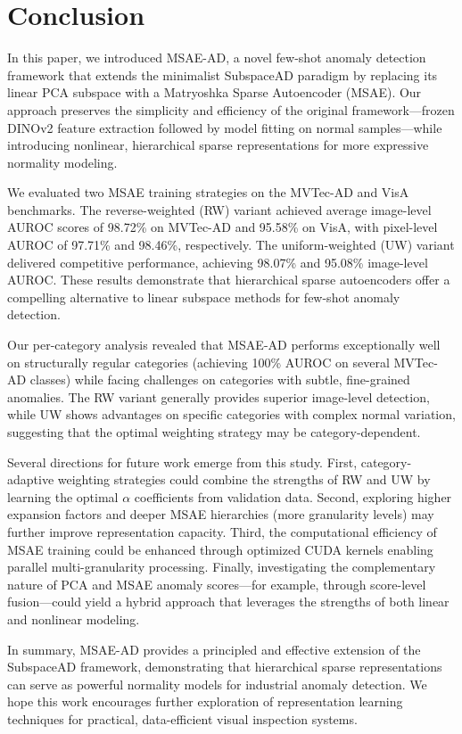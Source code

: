 \section{Conclusion}
\label{sec:conclusion}

In this paper, we introduced MSAE-AD, a novel few-shot anomaly detection framework that extends the minimalist SubspaceAD paradigm by replacing its linear PCA subspace with a Matryoshka Sparse Autoencoder (MSAE).
Our approach preserves the simplicity and efficiency of the original framework---frozen DINOv2 feature extraction followed by model fitting on normal samples---while introducing nonlinear, hierarchical sparse representations for more expressive normality modeling.

We evaluated two MSAE training strategies on the MVTec-AD and VisA benchmarks.
The reverse-weighted (RW) variant achieved average image-level AUROC scores of 98.72\% on MVTec-AD and 95.58\% on VisA, with pixel-level AUROC of 97.71\% and 98.46\%, respectively.
The uniform-weighted (UW) variant delivered competitive performance, achieving 98.07\% and 95.08\% image-level AUROC.
These results demonstrate that hierarchical sparse autoencoders offer a compelling alternative to linear subspace methods for few-shot anomaly detection.

Our per-category analysis revealed that MSAE-AD performs exceptionally well on structurally regular categories (achieving 100\% AUROC on several MVTec-AD classes) while facing challenges on categories with subtle, fine-grained anomalies.
The RW variant generally provides superior image-level detection, while UW shows advantages on specific categories with complex normal variation, suggesting that the optimal weighting strategy may be category-dependent.

Several directions for future work emerge from this study.
First, category-adaptive weighting strategies could combine the strengths of RW and UW by learning the optimal $\alpha$ coefficients from validation data.
Second, exploring higher expansion factors and deeper MSAE hierarchies (more granularity levels) may further improve representation capacity.
Third, the computational efficiency of MSAE training could be enhanced through optimized CUDA kernels enabling parallel multi-granularity processing.
Finally, investigating the complementary nature of PCA and MSAE anomaly scores---for example, through score-level fusion---could yield a hybrid approach that leverages the strengths of both linear and nonlinear modeling.

In summary, MSAE-AD provides a principled and effective extension of the SubspaceAD framework, demonstrating that hierarchical sparse representations can serve as powerful normality models for industrial anomaly detection.
We hope this work encourages further exploration of representation learning techniques for practical, data-efficient visual inspection systems.
